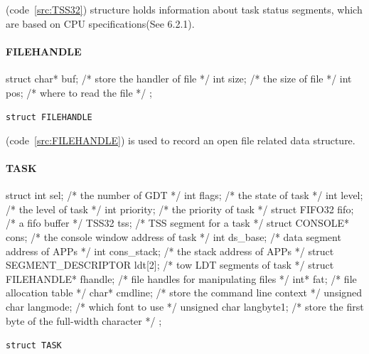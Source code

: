 \documentclass{swfcthesis}
\begin{document}
(code~\ref{src:TSS32}) structure holds information about task status segments, which are
based on CPU specifications(See 6.2.1\cite{intel_3a}).


\paragraph{FILEHANDLE}

\begin{listing}[H]
  \begin{codeblock}
\begin{ccode}
struct 
{ 
  char* buf; /* store the handler of file */
  int size;  /* the size of file */
  int pos;   /* where to read the file */
};
\end{ccode}
  \end{codeblock}
  \caption{\texttt{struct FILEHANDLE}}\label{src:FILEHANDLE}
\end{listing}

(code~\ref{src:FILEHANDLE}) is used to record an open file related data structure.



\paragraph{TASK}

\begin{listing}[H]
  \begin{codeblock}
\begin{ccode}
struct 
{ 
  int sel;                          /* the number of GDT */
  int flags;                        /* the state of task */
  int level;                        /* the level of task */
  int priority;                     /* the priority of task */
  struct FIFO32 fifo;               /* a fifo buffer */
  TSS32 tss;                        /* TSS segment for a task */
  struct CONSOLE* cons;             /* the console window address of task */
  int ds_base;                      /* data segment address of APPs */
  int cons_stack;                   /* the stack address of APPs */
  struct SEGMENT_DESCRIPTOR ldt[2]; /* tow LDT segments of task */
  struct FILEHANDLE* fhandle;       /* file handles for manipulating files */
  int* fat;                         /* file allocation table */
  char* cmdline;                    /* store the command line context */
  unsigned char langmode;           /* which font to use */
  unsigned char langbyte1;          /* store the first byte of the full-width character */
};
\end{ccode}
  \end{codeblock}
  \caption{\texttt{struct TASK}}\label{src:TASK}
\end{listing}
\end{document}
